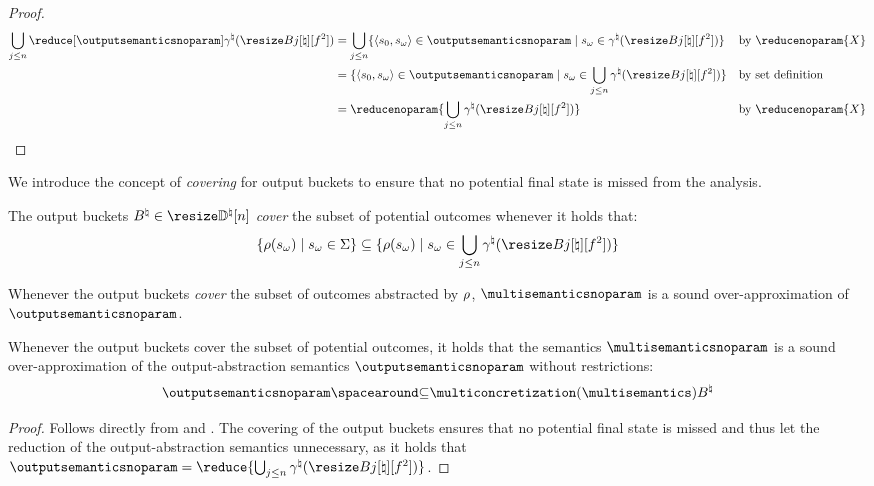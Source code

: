 \begin{proof}
\begin{align*}
    \bigsetjoin_{j\le n}\reducedoutputsemanticsnoparam &= \bigsetjoin_{j\le n} \setdef{\inputoutputtuple{\defstate}\in\outputsemanticsnoparam}{\retrieveoutput{\defstate}\in\abstractdomainconcretization(\bucket)}
      && \text{by $\reducenoparam{X}$} \\
    &= \setdef{\inputoutputtuple{\defstate}\in\outputsemanticsnoparam}{\retrieveoutput{\defstate}\in\bigsetjoin_{j \le n}\abstractdomainconcretization(\bucket)}
      && \text{by set definition} \\
    &= \reducenoparam{\bigsetjoin_{j \le n}\abstractdomainconcretization(\bucket)}
      && \text{by $\reducenoparam{X}$}
  \end{align*}
  \end{proof}

We introduce the concept of \emph{covering} for output buckets to ensure that no potential final state is missed from the analysis.

\begin{definition}[Covering]\label{def:covering}
  The output buckets $\buckets\in\vectorbuckets$ \textit{cover} the subset of potential outcomes whenever it holds that:
  \[
    \setdef{\outputobs(\retrieveoutput\defstate)}{\retrieveoutput{\defstate} \in \state} \subseteq \setdef{\outputobs(\retrieveoutput\defstate)}{\retrieveoutput\defstate\in\bigsetjoin_{j\le n}\abstractdomainconcretization(\bucket)}
  \]
\end{definition}


Whenever the output buckets \textit{cover} the subset of outcomes abstracted by $\rho$, $\multisemanticsnoparam$ is a sound over-approximation of $\outputsemanticsnoparam$.

\begin{lemma}
  Whenever the output buckets cover the subset of potential outcomes, it holds that the semantics $\multisemanticsnoparam$ is a \textup{sound over-approximation} of the output-abstraction semantics $\outputsemanticsnoparam$ without restrictions:
  \[
    \outputsemanticsnoparam \SubseteQ \multiconcretization(\multisemantics)\buckets
  \]
\end{lemma}
\begin{proof}
  Follows directly from  and . The covering of the output buckets ensures that no potential final state is missed and thus let the reduction of the output-abstraction semantics unnecessary, as it holds that $\outputsemanticsnoparam = \reduce{\bigsetjoin_{j\le n}\abstractdomainconcretization(\bucket)}$.
\end{proof}

